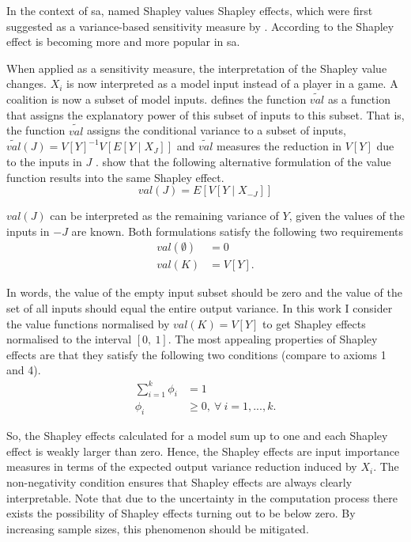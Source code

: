 In the context of sa, \citet{SNS16} named Shapley values Shapley effects, which were first suggested as a variance-based sensitivity measure by \citet{O14}. According to \citet{PRB20} the Shapley effect is becoming more and more popular in sa.

When applied as a sensitivity measure, the interpretation of the Shapley value changes. $X_i$ is now interpreted as a model input instead of a player in a game. A coalition is now a subset of model inputs. \citet{O14} defines the function $\widetilde{val}$ as a function that assigns the explanatory power of this subset of inputs to this subset. That is, the function $\widetilde{val}$ assigns the conditional variance to a subset of inputs, $\widetilde{val}(J)=V[Y]^{-1}V[E[Y \mid X_J]]$ and $\widetilde{val}$ measures the reduction in $V[Y]$ due to the inputs in $J$ \citep{SNS16}. \citep{SNS16} show that the following alternative formulation of the value function results into the same Shapley effect.
\begin{equation}
val(J)=E[V[Y \mid X_{- J}]]
\end{equation}

\noindent $val(J)$ can be interpreted as the remaining variance of $Y$, given the values of the inputs in $- J$ are known. Both formulations satisfy the following two requirements
\begin{align}
val(\emptyset)& = 0\\
val(K)& = V[Y].
\end{align}

\noindent In words, the value of the empty input subset should be zero and the value of the set of all inputs should equal the entire output variance. In this work I consider the value functions normalised by $val(K)=V[Y] $ to get Shapley effects normalised to the interval $ [0,\ 1] $. The most appealing properties of Shapley effects are that they satisfy the following two conditions (compare to axioms 1 and 4).
\begin{align}
\sum_{i=1}^{k}\phi_i& = 1\\
\phi_i& \geq 0,\ \forall \ i=1, ..., k.
\end{align}

\noindent So, the Shapley effects calculated for a model sum up to one and each Shapley effect is weakly larger than zero. Hence, the Shapley effects are input importance measures in terms of the expected output variance reduction induced by $X_i$. The non-negativity condition ensures that Shapley effects are always clearly interpretable. Note that due to the uncertainty in the computation process there exists the possibility of Shapley effects turning out to be below zero. By increasing sample sizes, this phenomenon should be mitigated.

